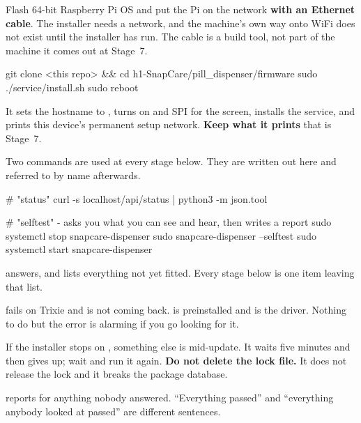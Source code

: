 \documentclass[11pt]{article}
\begin{document}
Flash 64-bit Raspberry Pi OS and put the Pi on the network \textbf{with an
Ethernet cable}. The installer needs a network, and the machine's own way onto
WiFi does not exist until the installer has run. The cable is a build tool, not
part of the machine \textemdash{} it comes out at Stage~7.

\begin{shell}
git clone <this repo> && cd h1-SnapCare/pill_dispenser/firmware
sudo ./service/install.sh
sudo reboot
\end{shell}

\noindent It sets the hostname to , turns on
\iic{} and SPI for the screen, installs the service, and prints
this device's permanent setup network. \textbf{Keep what it prints} \textemdash{}
that is Stage~7.

\vspace{3mm}
\noindent Two commands are used at every stage below. They are written out here
and referred to by name afterwards.

\begin{shell}
# "status"
curl -s localhost/api/status | python3 -m json.tool

# "selftest" - asks you what you can see and hear, then writes a report
sudo systemctl stop snapcare-dispenser
sudo snapcare-dispenser --selftest
sudo systemctl start snapcare-dispenser
\end{shell}

\begin{provebox}
\provetitle
{} answers, and  lists everything not yet fitted.
Every stage below is one item leaving that list.
\end{provebox}

\vspace{2mm}
\begin{warnbox}
 fails on Trixie and is not coming back.
 is preinstalled and is the driver. Nothing to do
\textemdash{} but the error is alarming if you go looking for it.

\vspace{1ex}
If the installer stops on ,
something else is mid-update. It waits five minutes and then gives up; wait and
run it again. \textbf{Do not delete the lock file.} It does not release the lock
and it breaks the package database.

\vspace{1ex}
 reports  for anything nobody answered. ``Everything
passed'' and ``everything anybody looked at passed'' are different sentences.
\end{warnbox}
\end{document}

